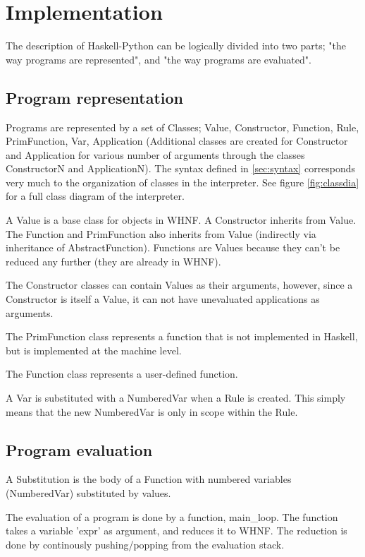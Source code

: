 \section{Implementation}

The description of Haskell-Python can be 
logically divided into two parts; "the way programs are 
represented", and "the way programs are evaluated".

\subsection{Program representation}

Programs are represented by a set of Classes; Value, Constructor, Function, Rule, 
PrimFunction, Var, Application (Additional classes are created for Constructor
and Application for various number of arguments through the classes ConstructorN 
and ApplicationN). The syntax defined in \ref{sec:syntax} corresponds very much
to the organization of classes in the interpreter. See figure \ref{fig:classdia} 
for a full class diagram of the interpreter.

A Value is a base class for objects in WHNF. A Constructor inherits from Value.
The Function and PrimFunction also inherits from Value (indirectly 
via inheritance of AbstractFunction). Functions are Values because they can't 
be reduced any further (they are already in WHNF).

The Constructor classes can contain Values as their arguments, however, since
a Constructor is itself a Value, it can not have unevaluated applications as
arguments.

The PrimFunction class represents a function that is not implemented in 
Haskell, but is implemented at the machine level.

The Function class represents a user-defined function.

A Var is substituted with a NumberedVar when a Rule is created. This simply
means that the new NumberedVar is only in scope within the Rule.

\subsection{Program evaluation}

A Substitution is the body of a Function with numbered variables 
(NumberedVar) substituted by values.

The evaluation of a program is done by a function, main\_loop. The function
takes a variable 'expr' as argument, and reduces it to WHNF. The reduction is done
by continously pushing/popping from the evaluation stack. 

